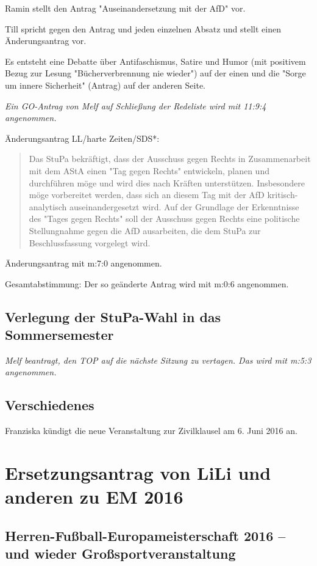 \documentclass[ngerman,headheight=70pt]{scrartcl}
\begin{document}
    Ramin stellt den Antrag "Auseinandersetzung mit der AfD" vor.

    Till spricht gegen den Antrag und jeden einzelnen Absatz und stellt einen
    Änderungsantrag vor.

    Es entsteht eine Debatte über Antifaschismus, Satire und Humor (mit positivem
    Bezug zur Lesung "Bücherverbrennung nie wieder") auf der einen und die "Sorge
    um innere Sicherheit" (Antrag) auf der anderen Seite.

    \textit{Ein GO-Antrag von Melf auf Schließung der Redeliste wird mit 11:9:4
    angenommen.}

    \newpage
    Änderungsantrag LL/harte Zeiten/SDS*:
    \blockquote{Das StuPa bekräftigt, dass der
    Ausschuss gegen Rechts in Zusammenarbeit mit dem AStA einen "Tag gegen Rechts"
    entwickeln, planen und durchführen möge und wird dies nach Kräften unterstützen.
    Insbesondere möge vorbereitet werden, dass sich an diesem Tag mit der AfD
    kritisch-analytisch auseinandergesetzt wird. Auf der Grundlage der Erkenntnisse
    des "Tages gegen Rechts" soll der Ausschuss gegen Rechts eine politische
    Stellungnahme gegen die AfD ausarbeiten, die dem StuPa zur Beschlussfassung
    vorgelegt wird.}

    Änderungsantrag mit m:7:0 angenommen.

    Gesamtabstimmung: Der so geänderte Antrag wird mit m:0:6 angenommen.

    \subsection{Verlegung der StuPa-Wahl in das Sommersemester}

    \textit{Melf beantragt, den TOP auf die nächste Sitzung zu vertagen. Das
    wird mit m:5:3 angenommen.}

    \subsection{Verschiedenes}

    Franziska kündigt die neue Veranstaltung zur Zivilklausel am 6. Juni 2016 an.

    \newpage

    \section*{Ersetzungsantrag von LiLi und anderen zu EM 2016}

    \subsection*{Herren-Fußball-Europameisterschaft 2016 – und wieder
    Großsportveranstaltung}
\end{document}
